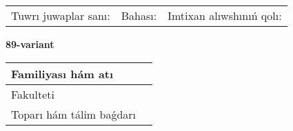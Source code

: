 \documentclass{article}
\begin{document}
\vspace{1cm}

\begin{tabular}{lll}
Tuwrı juwaplar sanı: \underline{\hspace{1.5cm}} & 
Bahası: \underline{\hspace{1.5cm}} & 
Imtixan alıwshınıń qolı: \underline{\hspace{2cm}} \\
\end{tabular}

\egroup

\newpage


\textbf{89-variant}\\

\bgroup
\def\arraystretch{1.6} %

\begin{tabular}{|m{5.7cm}|m{9.5cm}|}
\hline
Familiyası hám atı & \\
\hline
Fakulteti  & \\
\hline
Toparı hám tálim baǵdarı  & \\
\hline
\end{tabular}

\vspace{1cm}
\end{document}
